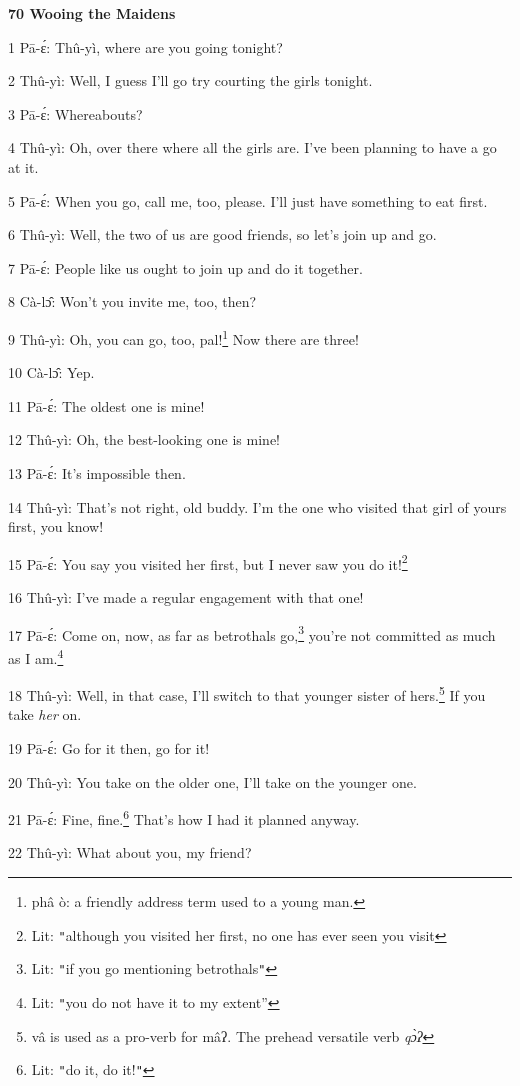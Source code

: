 
\textbf{70 Wooing the Maidens}

1 Pā-ɛ́: Thû-yì, where are you going tonight?

2 Thû-yì: Well, I guess I'll go try courting the girls tonight.

3 Pā-ɛ́: Whereabouts?

4 Thû-yì: Oh, over there where all the girls are. I've been planning to have
a go at it.

5 Pā-ɛ́: When you go, call me, too, please. I'll just have something to eat
first.

6 Thû-yì: Well, the two of us are good friends, so let's join up and go.

7 Pā-ɛ́: People like us ought to join up and do it together.

8 Cà-lɔ̂: Won't you invite me, too, then?

9 Thû-yì: Oh, you can go, too, pal!\footnote{phâ ò: a friendly address term used to a young man.} Now there are three!

10 Cà-lɔ̂: Yep.

11 Pā-ɛ́: The oldest one is mine!

12 Thû-yì: Oh, the best-looking one is mine!

13 Pā-ɛ́: It's impossible then.

14 Thû-yì: That's not right, old buddy. I'm the one who visited that girl of
yours first, you know!

15 Pā-ɛ́: You say you visited her first, but I never saw you do it!\footnote{Lit: \texttt{"}although you visited her first, no one has ever seen you visit}

16 Thû-yì: I've made a regular engagement with that one!

17 Pā-ɛ́: Come on, now, as far as betrothals go,\footnote{Lit: \texttt{"}if you go mentioning betrothals\texttt{"}} you're not committed as
much as I am.\footnote{Lit: \texttt{"}you do not have it to my extent''}

18 Thû-yì: Well, in that case, I'll switch to that younger sister of hers.\footnote{vâ is used as a pro-verb for mâʔ. The prehead versatile verb \textit{qɔ̀ʔ}}
If you take \textit{her} on.

19 Pā-ɛ́: Go for it then, go for it!

20 Thû-yì: You take on the older one, I'll take on the younger one.

21 Pā-ɛ́: Fine, fine.\footnote{Lit: \texttt{"}do it, do it!\texttt{"}} That's how I had it planned anyway.

22 Thû-yì: What about you, my friend?

